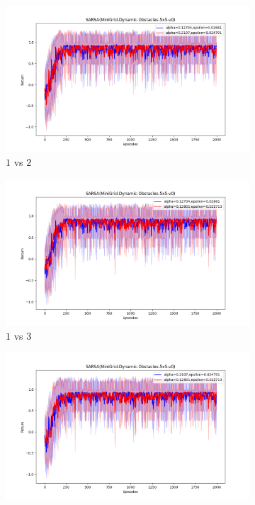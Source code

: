 \documentclass[11pt, a4]{article}
\begin{document}
				\begin{figure}[H]
					\centering
					\begin{subfigure}{.7\textwidth}
						\centering
						\includegraphics[width=\textwidth]{../minigrid_world/plots/sarsa_Figure_1.png}
						\caption{$1$ vs $2$}
						\label{fig:sarsaminigridworld1vs2}
					\end{subfigure}
					\hfill
					\begin{subfigure}{.7\textwidth}
						\centering
						\includegraphics[width=\textwidth]{../minigrid_world/plots/sarsa_Figure_2.png}
						\caption{$1$ vs $3$}
						\label{fig:sarsaminigridworld1vs3}
					\end{subfigure}
					\hfill
					\begin{subfigure}{.7\textwidth}
						\centering
						\includegraphics[width=\textwidth]{../minigrid_world/plots/sarsa_Figure_3.png}

\end{subfigure}
\end{figure}
\end{document}
